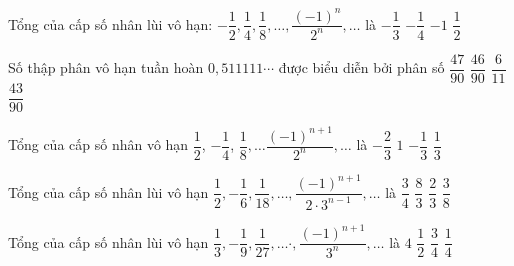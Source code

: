 \begin{ex}%
	Tổng của cấp số nhân lùi vô hạn: $-\dfrac{1}{2},\dfrac{1}{4},\dfrac{1}{8},\ldots,\dfrac{(-1)^n}{2^n},\ldots$ là 
	\choice
	{\True $-\dfrac{1}{3}$}
	{$-\dfrac{1}{4}$}
	{$-1$}
	{$\dfrac{1}{2}$}
\end{ex}
\begin{ex}%
	Số thập phân vô hạn tuần hoàn $0{,}511111\cdots$ được biểu diễn bởi phân số
	\choice
	{$\dfrac{47}{90}$}
	{\True $\dfrac{46}{90}$}
	{$\dfrac{6}{11}$}
	{$\dfrac{43}{90}$}
\end{ex}
\begin{ex}%
	Tổng của cấp số nhân vô hạn $\dfrac{1}{2}$, $-\dfrac{1}{4}$, $\dfrac{1}{8},\ldots\dfrac{(-1)^{n+1}}{2^n},\ldots$ là
	\choice
	{$-\dfrac{2}{3}$}
	{$1$}
	{$-\dfrac{1}{3}$}
	{\True $\dfrac{1}{3}$}
\end{ex}
\begin{ex}%
	Tổng của cấp số nhân lùi vô hạn $\dfrac{1}{2},-\dfrac{1}{6},\dfrac{1}{18},\ldots,\dfrac{(-1)^{n+1}}{2\cdot 3^{n-1}},\ldots$ là
	\choice
	{$\dfrac{3}{4}$}
	{$\dfrac{8}{3}$}
	{$\dfrac{2}{3}$}
	{\True $\dfrac{3}{8}$}
\end{ex}
\begin{ex}%
	Tổng của cấp số nhân lùi vô hạn $\dfrac{1}{3},-\dfrac{1}{9},\dfrac{1}{27},\ldots\cdot,\dfrac{(-1)^{n+1}}{3^n},\ldots$ là
	\choice
	{$4$}
	{$\dfrac{1}{2}$}
	{$\dfrac{3}{4}$}
	{\True $\dfrac{1}{4}$}
\end{ex}

